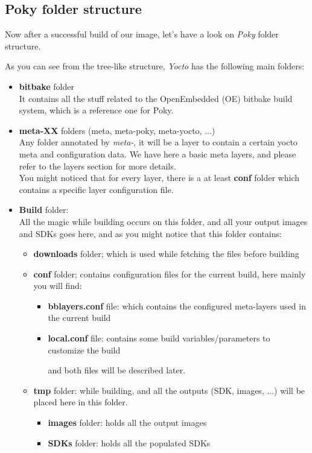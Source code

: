 \documentclass{article}
\begin{document}
\subsection{Poky folder structure}
Now after a successful build of our image, let's have a look on \textit{Poky} folder structure.


As you can see from the tree-like structure, \textit{Yocto} has the following main folders:
\begin{itemize}
  \item \textbf{bitbake} folder\\
  It contains all the stuff related to the OpenEmbedded (OE) bitbake build system, which is a reference one for Poky.
  \item \textbf{meta-XX} folders (meta, meta-poky, meta-yocto, ...)\\
  Any folder annotated by \textit{meta-}, it will be a layer to contain a certain yocto meta and configuration data. We have here a basic meta layers, and please
  refer to the layers section  for more details. \\

  You might noticed that for every layer, there is a at least \textbf{conf} folder which contains a specific layer configuration file.
  \item \textbf{Build} folder:\\
  All the magic while building occurs on this folder, and all your output images and SDKs goes here, and as you might notice that this folder contains:
    \begin{itemize}
      \item \textbf{downloads} folder; which is used while fetching the files before building
      \item \textbf{conf} folder; contains configuration files for the current build, here mainly you will find:
        \begin{itemize}
          \item \textbf{bblayers.conf} file: which contains the configured meta-layers used in the current build
          \item \textbf{local.conf} file: contains some build variables/parameters to customize the build
          
          and both files will be described later.
        \end{itemize}
      \item \textbf{tmp} folder: while building, and all the outputs (SDK, images, ...) will be placed here in this folder.
      \begin{itemize}
        \item \textbf{images} folder: holds all the output images
        \item \textbf{SDKs} folder: holds all the populated SDKs
      \end{itemize}
    \end{itemize}


\end{itemize}
\end{document}
